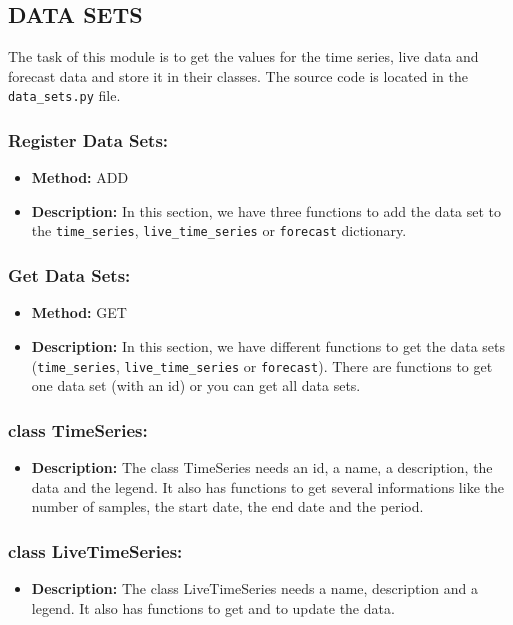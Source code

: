 \documentclass[11pt, a4paper]{article}
\begin{document}
\subsection{DATA SETS}
The task of this module is to get the values for the time series, live data and forecast data and store it in their classes.
The source code is located in the \texttt{data\_sets.py} file.


\subsubsection*{Register Data Sets:}
\begin{itemize}
 \item[] \textbf{Method:} ADD
 \item[] \textbf{Description:} In this section, we have three functions to add the data set to the \texttt{time\_series}, \texttt{live\_time\_series} or \texttt{forecast} dictionary.
\end{itemize}


\subsubsection*{Get Data Sets:}
\begin{itemize}
 \item[] \textbf{Method:} GET
 \item[] \textbf{Description:} In this section, we have different functions to get the data sets (\texttt{time\_series}, \texttt{live\_time\_series} or \texttt{forecast}). 
 There are functions to get one data set (with an id) or you can get all data sets.
\end{itemize}


\subsubsection*{class TimeSeries:}
\begin{itemize}
 \item[] \textbf{Description:} The class TimeSeries needs an id, a name, a description, the data and the legend. 
 It also has functions to get several informations like the number of samples, the start date, the end date and the period.
\end{itemize}


\subsubsection*{class LiveTimeSeries:}
\begin{itemize}
 \item[] \textbf{Description:} The class LiveTimeSeries needs a name, description and a legend.
 It also has functions to get and to update the data.
\end{itemize}
\end{document}
